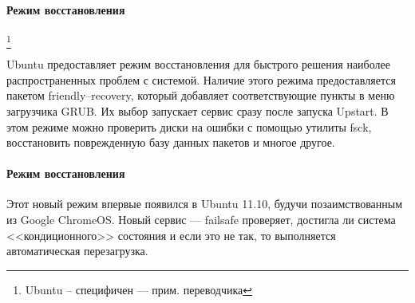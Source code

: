 \paragraph{Режим восстановления} \footnote{Ubuntu -- специфичен --- прим. переводчика}

Ubuntu предоставляет режим восстановления для быстрого решения наиболее распространенных проблем с системой. Наличие этого режима предоставляется пакетом friendly--recovery, который добавляет соответствующие пункты в меню загрузчика GRUB. Их выбор запускает сервис  сразу после запуска Upstart. В этом режиме можно проверить диски на ошибки с помощью утилиты fsck, восстановить поврежденную базу данных пакетов и многое другое.
\paragraph{Режим восстановления}

Этот новый режим впервые появился в Ubuntu 11.10, будучи позаимствованным из Google ChromeOS. Новый сервис --- failsafe проверяет, достигла ли система <<кондиционного>> состояния и если это не так, то выполняется автоматическая перезагрузка. 
